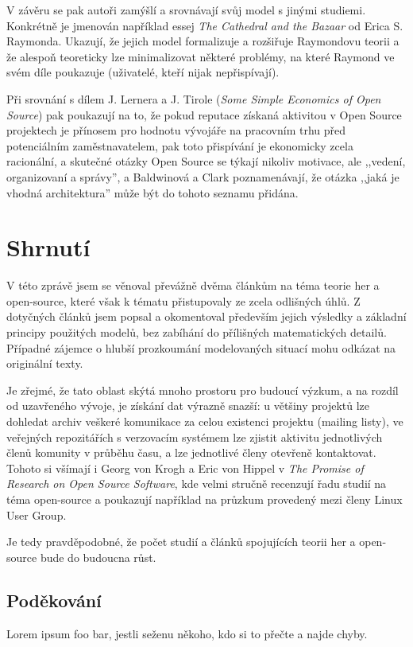 \begin{multicols}{2}
		V závěru se pak autoři zamýšlí a srovnávají svůj model s jinými studiemi. Konkrétně je jmenován například essej {\em The Cathedral and the Bazaar} od Erica S. Raymonda. Ukazují, že jejich model formalizuje a rozšiřuje Raymondovu teorii a že alespoň teoreticky lze minimalizovat některé problémy, na které Raymond ve svém díle poukazuje (uživatelé, kteří nijak nepřispívají).

	 	Při srovnání s dílem J. Lernera a J. Tirole ({\em Some Simple Economics of Open Source}) pak poukazují na to, že pokud reputace získaná aktivitou v Open Source projektech je přínosem pro hodnotu vývojáře na pracovním trhu před potenciálním zaměstnavatelem, pak toto přispívání je ekonomicky zcela racionální, a skutečné otázky Open Source se týkají nikoliv motivace, ale ,,vedení, organizovaní a správy'', a Baldwinová a Clark poznamenávají, že otázka ,,jaká je vhodná architektura'' může být do tohoto seznamu přidána.


\section{Shrnutí}
	V této zprávě jsem se věnoval převážně dvěma článkům na téma teorie her a open-source, které však k tématu přistupovaly ze zcela odlišných úhlů. Z dotyčných článků jsem popsal a okomentoval především jejich výsledky a základní principy použitých modelů, bez zabíhání do přílišných matematických detailů. Případné zájemce o hlubší prozkoumání modelovaných situací mohu odkázat na originální texty.

	Je zřejmé, že tato oblast skýtá mnoho prostoru pro budoucí výzkum, a na rozdíl od uzavřeného vývoje, je získání dat výrazně snazší: u většiny projektů lze dohledat archiv veškeré komunikace za celou existenci projektu (mailing listy), ve veřejných repozitářích s verzovacím systémem lze zjistit aktivitu jednotlivých členů komunity v průběhu času, a lze jednotlivé členy otevřeně kontaktovat. Tohoto si všímají i Georg von Krogh a Eric von Hippel v {\em The Promise of Research on Open Source Software}, kde velmi stručně recenzují řadu studií na téma open-source a poukazují například na průzkum provedený mezi členy Linux User Group.

	Je tedy pravděpodobné, že počet studií a článků spojujících teorii her a open-source bude do budoucna růst.



\subsection*{Poděkování}
Lorem ipsum foo bar, jestli seženu někoho, kdo si to přečte a najde chyby.




\end{multicols}
